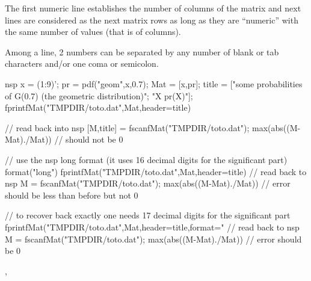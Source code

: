The first numeric line establishes the number of columns of the matrix and next lines
are considered as the next matrix rows as long as they are ``numeric'' with the same
number of values (that is of columns).

Among a line, 2 numbers can be separated by
any number of blank or tab characters and/or one coma or semicolon.


\begin{examples}
  \begin{mintednsp}{nsp}
x = (1:9)'; pr = pdf("geom",x,0.7);
Mat = [x,pr];
title = ["some probabilities of G(0.7) (the geometric distribution)";
         "X pr(X)"];
fprintfMat("TMPDIR/toto.dat",Mat,header=title)

// read  back into nsp
[M,title] = fscanfMat("TMPDIR/toto.dat");
max(abs((M-Mat)./Mat))  // should not be 0

// use the nsp long format (it uses 16 decimal digits for the significant part)
format("long")
fprintfMat("TMPDIR/toto.dat",Mat,header=title)
// read  back to nsp
M = fscanfMat("TMPDIR/toto.dat");
max(abs((M-Mat)./Mat))  // error should be less than before but not 0

// to recover back exactly one needs 17 decimal digits for the significant part
fprintfMat("TMPDIR/toto.dat",Mat,header=title,format="%
// read  back to nsp
M = fscanfMat("TMPDIR/toto.dat");
max(abs((M-Mat)./Mat))  // error should be 0
\end{mintednsp}
\end{examples}

\begin{manseealso}
  , 
\end{manseealso}

